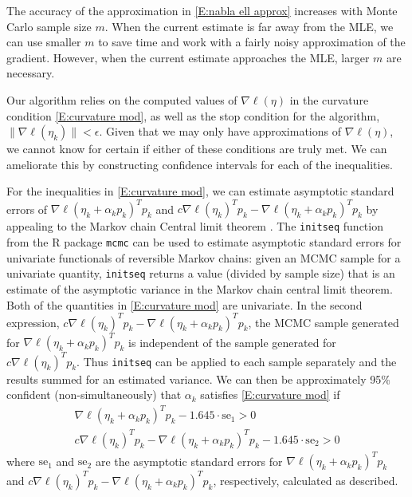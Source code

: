 \documentclass[oneside]{myumnStatThesis}
\begin{document}
The accuracy of the approximation in \eqref{E:nabla ell approx} increases with Monte Carlo sample size $m$. 
When the current estimate is far away from the MLE, we can use smaller $m$ to save time and work with a 
fairly noisy approximation of the gradient.  However, when the current estimate approaches the MLE, larger $m$ are necessary.

Our algorithm relies on the computed values of $\nabla \ell(\eta)$ in the curvature condition \eqref{E:curvature mod}, 
as well as the stop condition for the algorithm, $\lVert \nabla \ell( \eta_k ) \rVert < \epsilon$.  Given that we may 
only have approximations of $\nabla \ell(\eta)$, we cannot know for certain if either of these conditions are truly 
met.  We can ameliorate this by constructing confidence intervals for each of the inequalities.  

For the inequalities in \eqref{E:curvature mod}, we can estimate asymptotic standard errors of $\nabla \ell( \eta_k + 
\alpha_k p_k)^T p_k$  and $c \nabla \ell(\eta_k)^T p_k - \nabla \ell( \eta_k + \alpha_k p_k)^T p_k$ by appealing to the 
Markov chain Central limit theorem \citep{Chan:1994,Jones:2004,Roberts:1997,Roberts:2004}.
The \texttt{initseq} function from the R package \texttt{mcmc} \citep{mcmc:R} can be used to estimate asymptotic 
standard errors for univariate functionals of reversible Markov chains: given an MCMC sample for a univariate 
quantity, \texttt{initseq}
returns a value (divided by sample size) that is an estimate of the asymptotic variance in the Markov chain central 
limit theorem.  Both of the quantities in \eqref{E:curvature mod} are univariate.  In the second expression, $c \nabla \ell(\eta_k)^T 
p_k - \nabla \ell( \eta_k + \alpha_k p_k)^T p_k$, the MCMC sample generated for $\nabla \ell( \eta_k + \alpha_k p_k)^T 
p_k$ is independent of the sample generated for $c \nabla \ell(\eta_k)^T p_k$.  Thus \texttt{initseq} can be applied 
to each sample separately and the results summed for an estimated variance.  
We can then be approximately 95\% confident (non-simultaneously) that $\alpha_k$ satisfies \eqref{E:curvature 
mod} if
\begin{align*}
	 \nabla \ell( \eta_k + \alpha_k p_k)^T p_k - 1.645 \cdot \text{se}_1 > 0 \\
	 c \nabla \ell(\eta_k)^T p_k - \nabla \ell( \eta_k + \alpha_k p_k)^T p_k - 1.645 \cdot \text{se}_2 > 0 
\end{align*}
where $\text{se}_1$ and $\text{se}_2$ are the asymptotic standard errors for $\nabla \ell( \eta_k + \alpha_k p_k)^T p_k
$  and $c \nabla \ell(\eta_k)^T p_k - \nabla \ell( \eta_k + \alpha_k p_k)^T p_k$, respectively, calculated as described.
\end{document}
